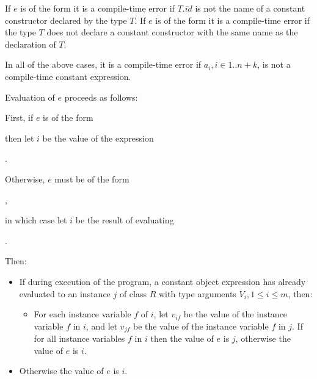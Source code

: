 \documentclass{article}
\begin{document}
\LMHash{}
If $e$ is of the form
it is a compile-time error if $T.id$ is not the name of a constant constructor declared by the type $T$.
If $e$ is of the form
it is a compile-time error if the type $T$ does not declare a constant constructor with the same name as the declaration of $T$.

\LMHash{}
In all of the above cases, it is a compile-time error if $a_i, i\in 1 .. n + k$, is not a compile-time constant expression.


\LMHash{}
Evaluation of $e$ proceeds as follows:

\LMHash{}
First, if $e$ is of the form


then let $i$ be the value of the expression

.

\LMHash{}
Otherwise, $e$ must be of the form

,

in which case let $i$ be the result of evaluating

.

\LMHash{}
Then:
\begin{itemize}
\item If during execution of the program, a constant object expression has already evaluated to an instance $j$ of class $R$ with type arguments $V_i, 1 \le i \le m$, then:
\begin{itemize}
\item For each instance variable $f$ of $i$, let $v_{if}$ be the value of the instance variable $f$ in $i$, and let $v_{jf}$ be the value of the instance variable $f$ in $j$.
  If  for all instance variables $f$ in $i$ then the value of $e$ is $j$, otherwise the value of $e$ is $i$.
\end{itemize}
\item Otherwise the value of $e$ is $i$.
\end{itemize}
\end{document}

